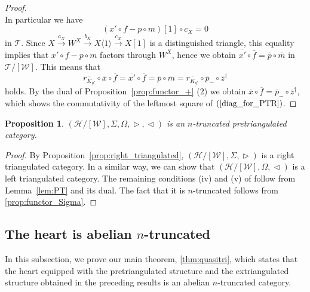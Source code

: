 \documentclass[a4paper,reqno,10pt]{amsart}
\newtheorem{proposition}[proposition]{Proposition}
\theoremstyle{definition}
\theoremstyle{definition}
\theoremstyle{definition}
\theoremstyle{definition}
\theoremstyle{plain}
\newcommand{\CH}{\mathcal{H}}
\newcommand{\CT}{\mathcal{T}}
\newcommand{\CW}{\mathcal{W}}
\begin{document}
\begin{proof}
\[\]
In particular we have
\[
(x'\circ f-p\circ m)[1]\circ c_X=0
\]
in $\CT$.
Since $X\xrightarrow{a_X}W^X\xrightarrow{b_X}X\langle1\rangle\xrightarrow{c_X}X[1]$ is a distinguished triangle, this equality implies that $x'\circ f-p\circ m$ factors through $W^X$, hence we obtain
$\overline{x'}\circ \overline{f}=\overline{p}\circ \overline{m}$
in $\CT/[\CW]$. This means that
\[
\overline{r_{K_{g'}}}\circ \overline{x}\circ \overline{f}
=\overline{x'}\circ \overline{f}
=\overline{p}\circ \overline{m}
=\overline{r_{K_{g'}}}\circ \overline{p}_-\circ \overline{z}^{\dagger}
\]
holds. By the dual of Proposition~\ref{prop:functor_+} {\rm (2)} we obtain $\overline{x}\circ \overline{f}=\overline{p}_-\circ \overline{z}^{\dagger}$, which shows the commutativity of the leftmost square of $(\ref{diag_for_PTR})$.
\end{proof}


\begin{proposition}\label{prop:pretriangulated}
$(\CH/[\CW],\Sigma,\Omega,\vartriangleright,\vartriangleleft)$ is 
an $n$-truncated 
\normalcolor
pretriangulated category.
\end{proposition}
\begin{proof}
By Proposition~\ref{prop:right_triangulated},
$(\CH/[\CW],\Sigma,\vartriangleright)$ is a right triangulated category.
In a similar way, we can show that $(\CH/[\CW],\Omega,\vartriangleleft)$ is a left triangulated category.
The remaining conditions {\rm (iv)} and {\rm (v)} of \cite[Definition~1.1]{BR07} follow from Lemma~\ref{lem:PT} and its dual. 
The fact that it is $n$-truncated follows from \cref{prop:functor_Sigma}. \normalcolor
\end{proof}

\subsection{The heart is abelian \texorpdfstring{$n$}{n}-truncated}
\label{subsection:nA_heart}
In this subsection, 
\color{blue}
we prove our main theorem, \cref{thm:quasitri}, which states that the heart equipped with the pretriangulated structure and the extriangulated structure obtained in the preceding results is an abelian $n$-truncated category.  
\normalcolor
\end{document}
